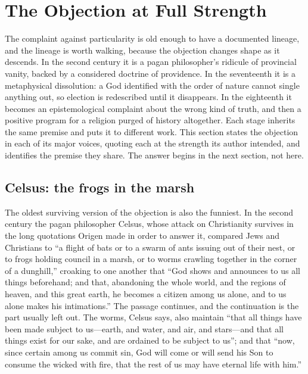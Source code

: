 \section{The Objection at Full Strength}

The complaint against particularity is old enough to have a documented lineage, and the lineage is worth walking, because the objection changes shape as it descends. In the second century it is a pagan philosopher's ridicule of provincial vanity, backed by a considered doctrine of providence. In the seventeenth it is a metaphysical dissolution: a God identified with the order of nature cannot single anything out, so election is redescribed until it disappears. In the eighteenth it becomes an epistemological complaint about the wrong kind of truth, and then a positive program for a religion purged of history altogether. Each stage inherits the same premise and puts it to different work. This section states the objection in each of its major voices, quoting each at the strength its author intended, and identifies the premise they share. The answer begins in the next section, not here.

\subsection{Celsus: the frogs in the marsh}

The oldest surviving version of the objection is also the funniest. In the second century the pagan philosopher Celsus, whose attack on Christianity survives in the long quotations Origen made in order to answer it, compared Jews and Christians to ``a flight of bats or to a swarm of ants issuing out of their nest, or to frogs holding council in a marsh, or to worms crawling together in the corner of a dunghill,'' croaking to one another that ``God shows and announces to us all things beforehand; and that, abandoning the whole world, and the regions of heaven, and this great earth, he becomes a citizen among us alone, and to us alone makes his intimations.'' The passage continues, and the continuation is the part usually left out. The worms, Celsus says, also maintain ``that all things have been made subject to us---earth, and water, and air, and stars---and that all things exist for our sake, and are ordained to be subject to us''; and that ``now, since certain among us commit sin, God will come or will send his Son to consume the wicked with fire, that the rest of us may have eternal life with him.''

